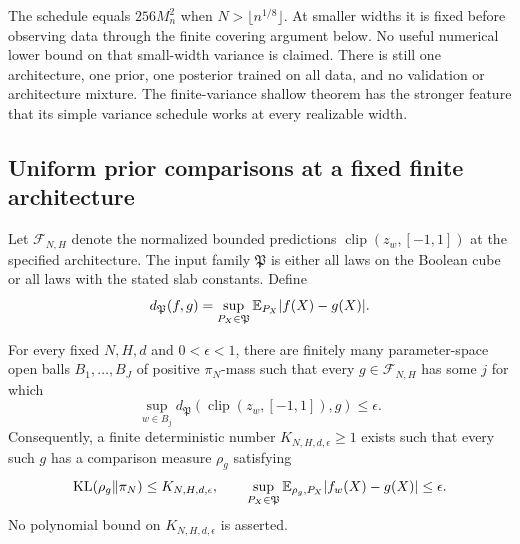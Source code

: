 The schedule equals $256M_n^2$ when $N>\lfloor n^{1/8}\rfloor$.  At smaller
widths it is fixed before observing data through the finite covering argument
below.  No useful numerical lower bound on that small-width variance is
claimed.  There is still one architecture, one prior, one
posterior trained on all data, and no validation or architecture mixture.
The finite-variance shallow theorem has the stronger feature that its
simple variance schedule works at every realizable width.

\subsection{Uniform prior comparisons at a fixed finite architecture}
Let $\mathcal F_{N,H}$ denote the normalized bounded predictions
$\operatorname{clip}(z_w,[-1,1])$ at the specified architecture.  The input
family $\mathfrak P$ is either all laws on the Boolean cube or all laws
with the stated slab constants.  Define
\[
 d_{\mathfrak P}(f,g)=\sup_{P_X\in\mathfrak P}\mathbb E_{P_X}|f(X)-g(X)|.
\]
\begin{lemma}
\label{lem:finite-architecture-prior-cost}
For every fixed $N,H,d$ and $0<\epsilon<1$, there are finitely many
parameter-space open balls $B_1,\ldots,B_J$ of positive $\pi_N$-mass such
that every $g\in\mathcal F_{N,H}$ has some $j$ for which
\[
 \sup_{w\in B_j}d_{\mathfrak P}
       (\operatorname{clip}(z_w,[-1,1]),g)\le\epsilon.
\]
Consequently, a finite deterministic number $K_{N,H,d,\epsilon}\ge1$
exists such that every such $g$ has a comparison measure $\rho_g$ satisfying
\[
 \operatorname{KL}(\rho_g\Vert\pi_N)\le K_{N,H,d,\epsilon},\qquad
 \sup_{P_X\in\mathfrak P}\mathbb E_{\rho_g,P_X}|f_w(X)-g(X)|\le\epsilon.
\]
No polynomial bound on $K_{N,H,d,\epsilon}$ is asserted.
\end{lemma}
